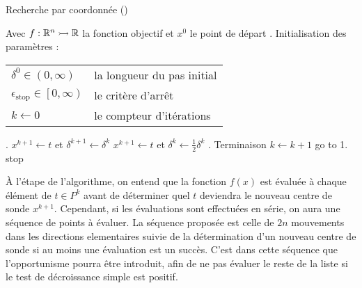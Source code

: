 \begin{algorithm}[H]
	\caption{\textsf{Recherche par coordonnée} (\CS)}
	\label{alg:cs}
	\begin{algorithmic}
		\STATE Avec $f:\mathbb{R}^n \rightarrowtail \mathbb{R}$ la fonction objectif et $x^0$ le point de départ
		. \textsf{Initialisation des paramètres} : 
		\bindent
		\STATE\begin{flushleft}
			\begin{tabular}{l l}
				$\delta^0 \in (0,\infty)$ & la longueur du pas initial\\
				$\epsilon_{\text{stop}} \in \left[ 0,\infty \right) $ & le critère d'arrêt\\
				$k \leftarrow 0$ & le compteur d'itérations\\
			\end{tabular}
		\end{flushleft}
		\eindent
		. \POLL
		\bindent
		\STATE $x^{k+1} \leftarrow t$ et $\delta^{k+1} \leftarrow \delta^k$
		\ELSE
		\STATE $x^{k+1} \leftarrow t$ et $\delta^{k} \leftarrow \frac{1}{2}\delta^k$
		\ENDIF
		\eindent
		. \textsf{Terminaison}
		\bindent
		\STATE $k\leftarrow k+1$
		\STATE go to 1.
		\ELSE
		\STATE stop
		\ENDIF
		\eindent
	\end{algorithmic}
\end{algorithm}
À l'étape \POLL de l'algorithme, on entend que la fonction $f(x)$ est évaluée à chaque élément de $t \in P^k$ avant de déterminer quel $t$ deviendra le nouveau centre de sonde $x^{k+1}$. Cependant, si les évaluations sont effectuées en série, on aura une séquence de points à évaluer. La séquence proposée est celle de $2n$ mouvements dans les directions elementaires suivie de la détermination d'un nouveau centre de sonde si au moins une évaluation est un succès. C'est dans cette séquence que l'opportunisme pourra être introduit, afin de ne pas évaluer le reste de la liste si le test de décroissance simple est positif.
